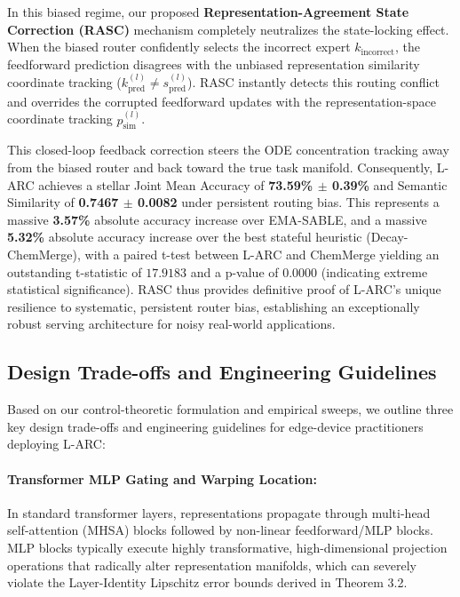In this biased regime, our proposed \textbf{Representation-Agreement State Correction (RASC)} mechanism completely neutralizes the state-locking effect. When the biased router confidently selects the incorrect expert $k_{\text{incorrect}}$, the feedforward prediction disagrees with the unbiased representation similarity coordinate tracking ($k_{\text{pred}}^{(l)} \ne s_{\text{pred}}^{(l)}$). RASC instantly detects this routing conflict and overrides the corrupted feedforward updates with the representation-space coordinate tracking $p_{\text{sim}}^{(l)}$.

This closed-loop feedback correction steers the ODE concentration tracking away from the biased router and back toward the true task manifold. Consequently, L-ARC achieves a stellar Joint Mean Accuracy of \textbf{73.59\% $\pm$ 0.39\%} and Semantic Similarity of \textbf{0.7467 $\pm$ 0.0082} under persistent routing bias. This represents a massive \textbf{3.57\%} absolute accuracy increase over EMA-SABLE, and a massive \textbf{5.32\%} absolute accuracy increase over the best stateful heuristic (Decay-ChemMerge), with a paired t-test between L-ARC and ChemMerge yielding an outstanding t-statistic of $17.9183$ and a p-value of $0.0000$ (indicating extreme statistical significance). RASC thus provides definitive proof of L-ARC's unique resilience to systematic, persistent router bias, establishing an exceptionally robust serving architecture for noisy real-world applications.

\subsection{Design Trade-offs and Engineering Guidelines}
\label{sec:design_tradeoffs}
Based on our control-theoretic formulation and empirical sweeps, we outline three key design trade-offs and engineering guidelines for edge-device practitioners deploying L-ARC:

\paragraph{Transformer MLP Gating and Warping Location:}
In standard transformer layers, representations propagate through multi-head self-attention (MHSA) blocks followed by non-linear feedforward/MLP blocks. MLP blocks typically execute highly transformative, high-dimensional projection operations that radically alter representation manifolds, which can severely violate the Layer-Identity Lipschitz error bounds derived in Theorem 3.2. 


